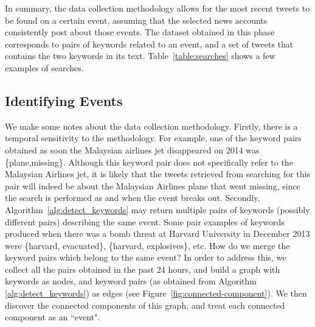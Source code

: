 In summary, the data collection methodology allows for the most recent tweets to
be found on a certain event, assuming that the selected news accounts
consistently post about those events. 
%
The dataset obtained in this phase corresponds to pairs of keywords related to
an event, and a set of tweets that contains the two keywords in its text.
%
Table~\ref{table:searches} shows a few examples of searches.


\subsection{Identifying Events}

We make some notes about the data collection methodology. 
%
Firstly, there is a temporal sensitivity to the methodology. 
%
For example, one of the keyword pairs obtained as soon the Malaysian airlines
jet disappeared on 2014 was \{plane,missing\}. 
%
Although this keyword pair does not specifically refer to the Malaysian Airlines
jet, it is likely that the tweets retrieved from searching for this pair will
indeed be about the Malaysian Airlines plane that went missing, since the search
is performed as and when the event breaks out. 
%
Secondly, Algorithm~\ref{alg:detect_keywords} may return multiple pairs of
keywords (possibly different pairs) describing the same event. 
%
Some pair examples of keywords produced when there was a bomb threat at Harvard
University in December 2013 were \{harvard, evacuated\}, \{harvard,
explosives\}, etc. 
%
How do we merge the keyword pairs which belong to the same event? 
%
In order to address this, we collect all the pairs obtained in the past $24$
hours, and build a graph with keywords as nodes, and keyword pairs (as obtained
from Algorithm {\ref{alg:detect_keywords}}) as edges (see
Figure~\ref{fig:connected-component}). 
%
We then discover the connected components of this graph, and treat each
connected component as an ``event". 
%



